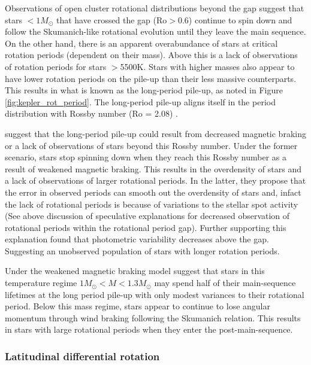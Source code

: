 Observations of open cluster rotational distributions beyond the gap suggest that stars $<1M_{\odot}$ that have crossed the gap (Ro$>$0.6) continue to spin down and follow the Skumanich-like rotational evolution until they leave the main sequence.
On the other hand, there is an apparent overabundance of stars at critical rotation periods (dependent on their mass). 
Above this is a lack of observations of rotation periods for stars $>$5500K.
Stars with higher masses also appear to have lower rotation periods on the pile-up than their less massive counterparts.
This results in what is known as the long-period pile-up, as noted in Figure \ref{fig:kepler_rot_period}.
The long-period pile-up aligns itself in the \citet{mcquillan_rotation_2014} period distribution with Rossby number  (Ro = 2.08) \citep{van_saders_forward_2019}.
 
\citet{van_saders_forward_2019} suggest that the long-period pile-up could result from decreased magnetic braking or a lack of observations of stars beyond this Rossby number.
Under the former scenario, stars stop spinning down when they reach this Rossby number as a result of weakened magnetic braking.
This results in the overdensity of stars and a lack of observations of larger rotational periods.
In the latter, they propose that the error in observed periods can smooth out the overdensity of stars and, infact the lack of rotational periods is because of variations to the stellar spot activity (See above discussion of speculative explanations for decreased observation of rotational periods within the rotational period gap).
Further supporting this explanation \citet{david_further_2022} found that photometric variability decreases above the gap.
Suggesting an unobserved population of stars with longer rotation periods.

Under the weakened magnetic braking model \citet{david_further_2022} suggest that stars in this temperature regime $1M_{\odot} < M < 1.3M_{\odot}$ may spend half of their main-sequence lifetimes at the long period pile-up with only modest variances to their rotational period.
Below this mass regime, stars appear to continue to lose angular momentum through wind braking following the Skumanich relation.
This results in stars with large rotational periods when they enter the post-main-sequence.


\subsubsection{Latitudinal differential rotation}

